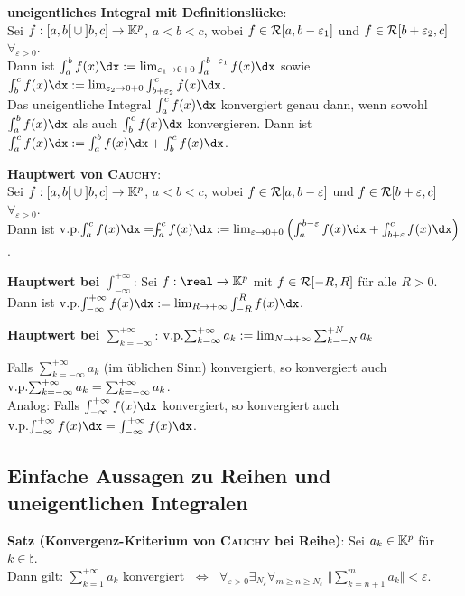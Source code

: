 \linie

\textbf{uneigentliches Integral mit Definitionslücke}: \\
Sei $f: \left[a,b\right[ \cup \left]b,c\right] \rightarrow \mathbb{K}^p$,
$a < b < c$, wobei $f \in \mathcal{R}[a, b - \varepsilon_1]$ und
$f \in \mathcal{R}[b + \varepsilon_2, c]$ $\forall_{\varepsilon > 0}$. \\
Dann ist $\int_a^b f(x)\dx :=
\lim_{\varepsilon_1 \to 0+0} \int_a^{b-\varepsilon_1} f(x)\dx$ sowie
$\int_b^c f(x)\dx :=
\lim_{\varepsilon_2 \to 0+0} \int_{b+\varepsilon_2}^c f(x)\dx$. \\
Das uneigentliche Integral $\int_a^c f(x)\dx$ konvergiert genau dann, wenn
sowohl $\int_a^b f(x)\dx$ als auch $\int_b^c f(x)\dx$
konvergieren.
Dann ist $\int_a^c f(x)\dx := \int_a^b f(x)\dx + \int_b^c f(x)\dx$.

\linie

\textbf{Hauptwert von \textsc{Cauchy}}: \\
Sei $f: \left[a,b\right[ \cup \left]b,c\right] \rightarrow \mathbb{K}^p$,
$a < b < c$, wobei $f \in \mathcal{R}[a, b - \varepsilon]$ und
$f \in \mathcal{R}[b + \varepsilon, c]$ $\forall_{\varepsilon > 0}$. \\
Dann ist $\vp\int_a^c f(x)\dx = \intstrich\int_a^c f(x)\dx :=
\lim_{\varepsilon \to 0+0} \left(\int_a^{b-\varepsilon} f(x)\dx +
\int_{b+\varepsilon}^c f(x)\dx\right)$.

\textbf{Hauptwert bei $\int_{-\infty}^{+\infty}$}:
Sei $f: \real \rightarrow \field^p$ mit $f \in \mathcal{R}[-R, R]$ für alle
$R > 0$. \\
Dann ist $\vp\int_{-\infty}^{+\infty} f(x)\dx :=
\lim_{R \to +\infty} \int_{-R}^R f(x)\dx$.

\textbf{Hauptwert bei $\sum_{k=-\infty}^{+\infty}$}:
$\operatorname{v.\!p.\!}\sum_{k=\infty}^{+\infty} a_k := \lim_{N \to +\infty} \sum_{k=-N}^{+N} a_k$

Falls $\sum_{k=-\infty}^{+\infty} a_k$ (im üblichen Sinn) konvergiert,
so konvergiert auch
$\operatorname{v.\!p.\!}\sum_{k=-\infty}^{+\infty} a_k = \sum_{k=-\infty}^{+\infty} a_k$. \\
Analog:
Falls $\int_{-\infty}^{+\infty} f(x)\dx$ konvergiert,
so konvergiert auch
$\vp\int_{-\infty}^{+\infty} f(x)\dx = \int_{-\infty}^{+\infty} f(x)\dx$.

\subsection{%
    Einfache Aussagen zu Reihen und uneigentlichen Integralen%
}

\textbf{Satz (Konvergenz-Kriterium von \textsc{Cauchy} bei Reihe)}:
Sei $a_k \in \mathbb{K}^p$ für $k \in \natural$. \\
Dann gilt:
$\sum_{k=1}^{+\infty} a_k$ konvergiert $\;\Leftrightarrow\;$
$\forall_{\varepsilon > 0} \exists_{N_\varepsilon}
\forall_{m \ge n \ge N_\varepsilon}\;
\big\Vert \sum_{k=n+1}^m a_k \big\Vert < \varepsilon$.

